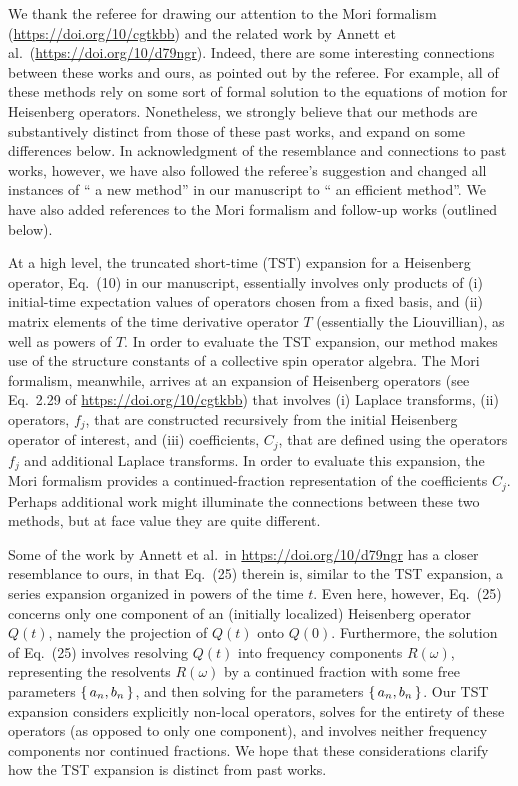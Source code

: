 \documentclass[preprint,superscriptaddress]{revtex4-2}
\newcommand{\1}{\mathds{1}}
\newcommand{\red}[1]{{\color{red} #1}}
\newcommand{\green}[1]{{\color{ForestGreen} #1}}
\begin{document}
\begin{enumerate}
  We thank the referee for drawing our attention to the Mori formalism
  (\url{https://doi.org/10/cgtkbb}) and the related work by Annett et
  al.~(\url{https://doi.org/10/d79ngr}).  Indeed, there are some
  interesting connections between these works and ours, as pointed out
  by the referee.  For example, all of these methods rely on some sort
  of formal solution to the equations of motion for Heisenberg
  operators.  Nonetheless, we strongly believe that our methods are
  substantively distinct from those of these past works, and expand on
  some differences below.  In acknowledgment of the resemblance and
  connections to past works, however, we have also followed the
  referee's suggestion and changed all instances of ``\red{a new
    method}'' in our manuscript to ``\green{an efficient method}''.
  We have also added references to the Mori formalism and follow-up
  works (outlined below).

  At a high level, the truncated short-time (TST) expansion for a
  Heisenberg operator, Eq.~(10) in our manuscript, essentially
  involves only products of (i) initial-time expectation values of
  operators chosen from a fixed basis, and (ii) matrix elements of the
  time derivative operator $T$ (essentially the Liouvillian), as well
  as powers of $T$.  In order to evaluate the TST expansion, our
  method makes use of the structure constants of a collective spin
  operator algebra.  The Mori formalism, meanwhile, arrives at an
  expansion of Heisenberg operators (see Eq.~2.29 of
  \url{https://doi.org/10/cgtkbb}) that involves (i) Laplace
  transforms, (ii) operators, $f_j$, that are constructed recursively
  from the initial Heisenberg operator of interest, and (iii)
  coefficients, $C_j$, that are defined using the operators $f_j$ and
  additional Laplace transforms.  In order to evaluate this expansion,
  the Mori formalism provides a continued-fraction representation of
  the coefficients $C_j$.  Perhaps additional work might illuminate
  the connections between these two methods, but at face value they
  are quite different.

  Some of the work by Annett et al.~in \url{https://doi.org/10/d79ngr}
  has a closer resemblance to ours, in that Eq.~(25) therein is,
  similar to the TST expansion, a series expansion organized in powers
  of the time $t$.  Even here, however, Eq.~(25) concerns only one
  component of an (initially localized) Heisenberg operator $Q(t)$,
  namely the projection of $Q(t)$ onto $Q(0)$.  Furthermore, the
  solution of Eq.~(25) involves resolving $Q(t)$ into frequency
  components $R(\omega)$, representing the resolvents $R(\omega)$ by a
  continued fraction with some free parameters $\set{a_n,b_n}$, and
  then solving for the parameters $\set{a_n,b_n}$.  Our TST expansion
  considers explicitly non-local operators, solves for the entirety of
  these operators (as opposed to only one component), and involves
  neither frequency components nor continued fractions.  We hope that
  these considerations clarify how the TST expansion is distinct from
  past works.


\end{enumerate}
\end{document}
